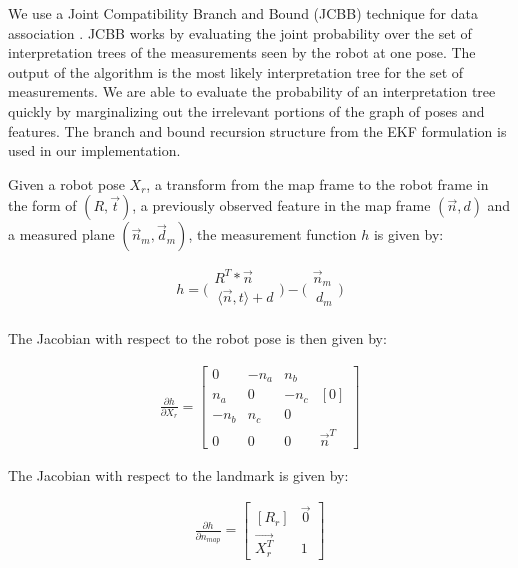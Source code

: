 \documentclass[3p]{elsarticle}
\begin{document}
We use a Joint Compatibility Branch and Bound (JCBB) technique for data association \cite{neira2001data}. JCBB works by evaluating the joint
probability over the set of interpretation trees of the measurements seen by the robot
at one pose. The output of the algorithm is the most likely interpretation tree for
the set of measurements. We are able to evaluate the probability of an interpretation
tree quickly by marginalizing out the irrelevant portions of the graph of poses and features. The branch and bound recursion structure from the EKF formulation is
used in our implementation.

Given a robot pose $X_r$, a transform from the map frame to the robot frame in the form of $(R, \vec{t})$, a previously
observed feature in the map frame $(\vec{n}, d)$ and a measured plane $(\vec{n}_m , \vec{d}_m )$, the measurement function $h$ is given by:

\begin{equation}
h=\bigg(
\begin{array}{c}
R^T*\vec{n}\\
\ \langle \vec{n},t\rangle + d \\
\end{array}
\bigg) -
\bigg(
\begin{array}{c}
\vec{n}_m\\
\ d_m\\
\end{array}
\bigg)
\end{equation}

The Jacobian with respect to the robot pose is then given by:

\begin{align}
\frac{\partial h}{\partial X_r}
 =
\begin{bmatrix} 
 0 & -n_a & n_b\\
 n_a & 0 & -n_c & [0]\\
 -n_b & n_c & 0\\
 0 & 0 & 0 & \vec{n}^T
\end{bmatrix}
\end{align}

The Jacobian with respect to the landmark is given by:

\begin{align}
\frac{\partial h}{\partial n_{map}}
 =
\begin{bmatrix} 
 [R_r] & \vec{0}\\
 \vec{X_r^T} & 1
\end{bmatrix}
\end{align}
\end{document}
